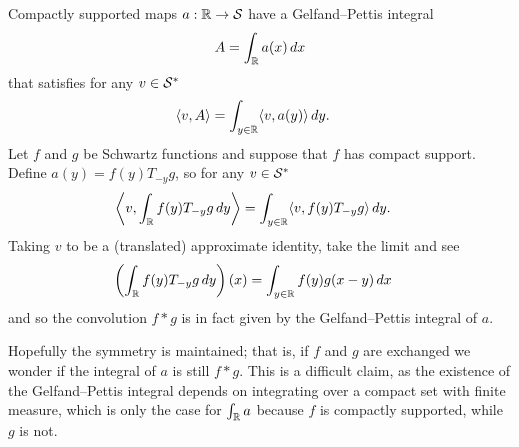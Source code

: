     Compactly supported maps $a:\mathbb{R}\rightarrow\mathcal{S}$ have a Gelfand--Pettis integral 
    \begin{align*}
      A = \int_\mathbb{R} a(x)\,dx
    \end{align*}
    that satisfies for any $v\in\mathcal{S}^*$
    \begin{align*}
      \langle v, A\rangle
      &= \int_{y\in\mathbb{R}} \langle v, a(y)\rangle\,dy \text{.}
    \end{align*}
    Let $f$ and $g$ be Schwartz functions and suppose that $f$ has compact support.
    Define $a(y)=f(y)T_{-y}g$, so for any $v\in\mathcal{S}^*$
    \begin{align*}
      \left\langle v, \int_{\mathbb{R}} f(y)T_{-y}g\,dy \right\rangle
      &= \int_{y\in\mathbb{R}} \langle v, f(y)T_{-y}g\rangle\, dy \text{.}
    \end{align*}
    Taking $v$ to be a (translated) approximate identity, take the limit and see
    \begin{align*}
      \left( \int_{\mathbb{R}} f(y)T_{-y}g\,dy \right)(x)
      &= \int_{y\in\mathbb{R}} f(y)g(x-y)\,dx
    \end{align*}
    and so the convolution $f*g$ is in fact given by the Gelfand--Pettis integral of $a$.
    
    Hopefully the symmetry is maintained; that is, if $f$ and $g$ are exchanged we wonder if the integral of $a$ is still $f*g$.
    This is a difficult claim, as the existence of the Gelfand--Pettis integral depends on integrating over a compact set with finite measure, which is only the case for $\int_\mathbb{R} a$ because $f$ is compactly supported, while $g$ is not.


